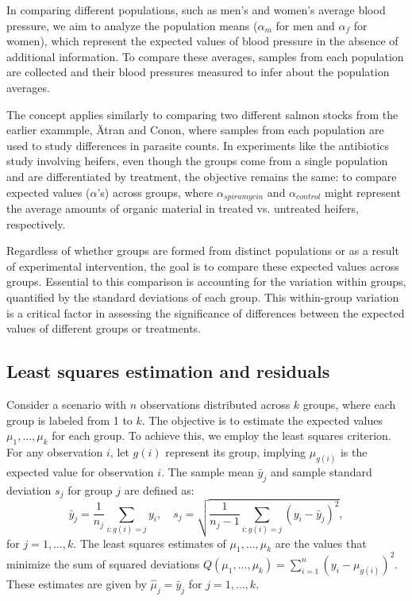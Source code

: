 \documentclass{article}
\begin{document}
In comparing different populations, such as men's and women's average blood pressure, we aim to analyze the population means ($\alpha_m$ for men and $\alpha_f$ for women), which represent the expected values of blood pressure in the absence of additional information. To compare these averages, samples from each population are collected and their blood pressures measured to infer about the population averages.

The concept applies similarly to comparing two different salmon stocks from the earlier exammple, Ätran and Conon, where samples from each population are used to study differences in parasite counts. In experiments like the antibiotics study involving heifers, even though the groups come from a single population and are differentiated by treatment, the objective remains the same: to compare expected values ($\alpha$'s) across groups, where $\alpha_{spiramycin}$ and $\alpha_{control}$ might represent the average amounts of organic material in treated vs. untreated heifers, respectively.

Regardless of whether groups are formed from distinct populations or as a result of experimental intervention, the goal is to compare these expected values across groups. Essential to this comparison is accounting for the variation within groups, quantified by the standard deviations of each group. This within-group variation is a critical factor in assessing the significance of differences between the expected values of different groups or treatments.

\subsection{Least squares estimation and residuals}
Consider a scenario with $n$ observations distributed across $k$ groups, where each group is labeled from 1 to $k$. The objective is to estimate the expected values $\mu_1, \ldots, \mu_k$ for each group. To achieve this, we employ the least squares criterion. For any observation $i$, let $g(i)$ represent its group, implying $\mu_{g(i)}$ is the expected value for observation $i$. The sample mean $\bar{y}_j$ and sample standard deviation $s_j$ for group $j$ are defined as:
\[
\bar{y}_j = \frac{1}{n_j} \sum_{i:g(i)=j} y_i, \quad s_j = \sqrt{\frac{1}{n_j - 1} \sum_{i:g(i)=j} (y_i - \bar{y}_j)^2},
\]
for $j = 1, \ldots, k$. The least squares estimates of $\mu_1, \ldots, \mu_k$ are the values that minimize the sum of squared deviations $Q(\mu_1, \ldots, \mu_k) = \sum_{i=1}^{n} (y_i - \mu_{g(i)})^2$. These estimates are given by $\hat{\mu}_j = \bar{y}_j$ for $j = 1, \ldots, k$.
\end{document}
